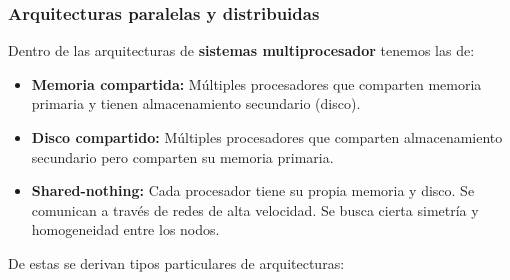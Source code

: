 \subsubsection*{Arquitecturas paralelas y distribuidas}
Dentro de las arquitecturas de \textbf{sistemas multiprocesador} tenemos las de:
\begin{itemize}
    \item \textbf{Memoria compartida:} Múltiples procesadores que comparten memoria primaria y tienen almacenamiento secundario (disco).
    \item \textbf{Disco compartido:} Múltiples procesadores que comparten almacenamiento secundario pero comparten su memoria primaria.
    \item \textbf{Shared-nothing:} Cada procesador tiene su propia memoria y disco. Se comunican a través de redes de alta velocidad. Se busca cierta simetría y homogeneidad entre los nodos.
\end{itemize}
De estas se derivan tipos particulares de arquitecturas:
